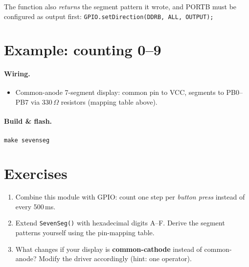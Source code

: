 \documentclass[11pt,a4paper]{article}
\begin{document}
The function also \emph{returns} the segment pattern it wrote, and PORTB
must be configured as output first:
\lstinline|GPIO.setDirection(DDRB, ALL, OUTPUT);|

\section{Example: counting 0--9}

\paragraph{Wiring.}
\begin{itemize}
  \item Common-anode 7-segment display: common pin to VCC, segments to
        PB0--PB7 via 330\,$\Omega$ resistors (mapping table above).
\end{itemize}

\paragraph{Build \& flash.} \texttt{make sevenseg}



\section{Exercises}

\begin{enumerate}
  \item Combine this module with GPIO: count one step per \emph{button press}
        instead of every 500\,ms.
  \item Extend \texttt{SevenSeg()} with hexadecimal digits A--F. Derive the
        segment patterns yourself using the pin-mapping table.
  \item What changes if your display is \textbf{common-cathode} instead of
        common-anode? Modify the driver accordingly (hint: one operator).
\end{enumerate}
\end{document}
